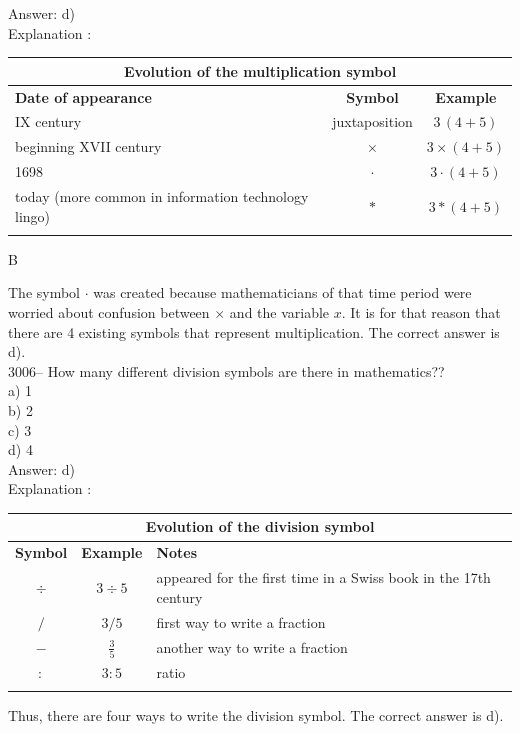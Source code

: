 \documentclass[letterpaper, 12pt]{article}
\begin{document}
Answer: d)\\

Explanation :\\
\begin{center}
\begin{tabular}{|l|c|c|}
\multicolumn{3}{c}{\bf Evolution of the multiplication symbol}\\[2mm] \hline
{\bf Date of appearance} & {\bf Symbol} & {\bf Example} \\[1mm] \hline \hline
{IX century} & {juxtaposition} & $3 \, (4 + 5)$ \\[1mm] \hline
beginning XVII century & $\times$ & $3 \times (4 + 5)$ \\[1mm] \hline
1698 & $\cdot$ & $3 \cdot (4 + 5)$ \\[1mm] \hline
today (more common in information technology lingo) & $\ast$ & $3 \ast (4 + 5)$ \\[1mm] \hline
\multicolumn{3}{c}{}
\end{tabular}B
\end{center}
The symbol $\cdot$ was created because mathematicians of that time period were worried about confusion between $\times$ and the variable $x$. It is for that reason that there are 4 existing symbols that represent multiplication. The correct answer is d).\\



3006-- How many different division symbols are there in mathematics??\\

a) 1\\
b) 2\\
c) 3\\
d) 4\\

Answer: d)\\

Explanation :\\
\begin{center}
\begin{tabular}{|c|c|l|}
\multicolumn{3}{c}{\bf Evolution of the division symbol}\\[2mm] \hline
{\bf Symbol} & {\bf Example} & {\bf Notes} \\ \hline \hline
$\div$ & $3 \div 5$ & appeared for the first time in a Swiss book in the 17th century \\[1mm] \hline
$/$ & $3 / 5$ & first way to write a fraction\\[1mm] \hline
$-$ & $\frac{3}{5}$ & another way to write a fraction \\[1mm] \hline
$:$ & $3:5$ & ratio \\[1mm] \hline
\multicolumn{3}{c}{}
\end{tabular}
\end{center}
Thus, there are four ways to write the division symbol. The correct answer is d).\\
\end{document}
